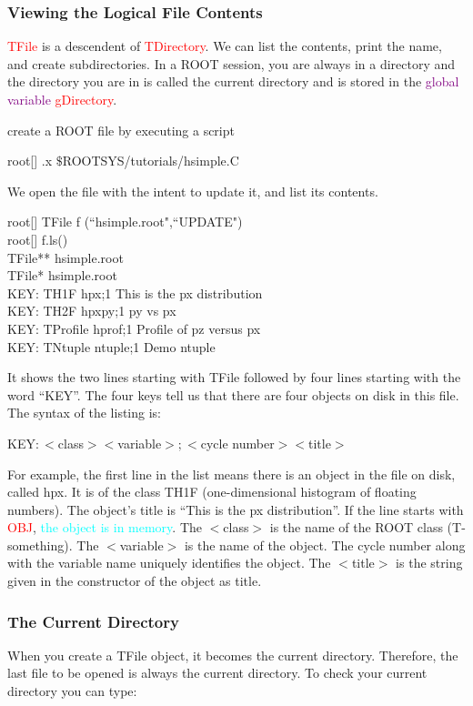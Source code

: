 \documentclass[12pt,a4paper]{article}
\begin{document}
\subsubsection{Viewing the Logical File Contents}
\textcolor{red}{TFile} is a descendent of \textcolor{red}{TDirectory}. We can list the contents, print the name, and create subdirectories. In a ROOT session, you are always in a directory and the directory you are in is called the current directory and is stored in the \textcolor{purple}{global variable} \textcolor{red}{gDirectory}.

create a ROOT file by executing a script

root[] .x $\$$ROOTSYS/tutorials/hsimple.C

We open the file with the intent to update it, and list its contents.

root[] TFile f (``hsimple.root",``UPDATE") \\
root[] f.ls() \\
TFile** hsimple.root \\ 
TFile* hsimple.root \\
KEY: TH1F hpx;1 This is the px distribution \\
KEY: TH2F hpxpy;1 py vs px \\
KEY: TProfile hprof;1 Profile of pz versus px \\
KEY: TNtuple ntuple;1 Demo ntuple


It shows the two lines starting with TFile followed by four lines starting with the word “KEY”. The four keys tell us
that there are four objects on disk in this file. The syntax of the listing is:

KEY$: <$class$> <$variable$>;<$cycle number$> <$title$>$

For example, the first line in the list means there is an object in the file on disk, called hpx. It is of the class TH1F (one-dimensional histogram of floating numbers). The object’s title is ``This is the px distribution”. If the line starts with \textcolor{red}{OBJ}, \textcolor{cyan}{the object is in memory}. The $<$class$>$ is the name of the ROOT class (T-something). The $<$variable$>$ is the name of the object. The cycle number along with the variable name uniquely identifies the object. The $<$title$>$ is the string given in the constructor of the object as title.

\subsubsection{The Current Directory}
When you create a TFile object, it becomes the current directory. Therefore, the last file to be opened is always the
current directory. To check your current directory you can type:
\end{document}
